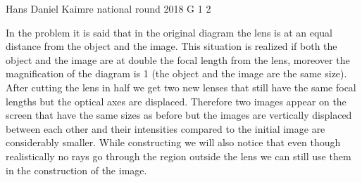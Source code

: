 \documentclass[11pt]{article}
\begin{document}
{Hans Daniel Kaimre} %
{national round} %
{2018} %
{G 1} %
{2} %
{

\ifEngSolution
In the problem it is said that in the original diagram the lens is at an equal distance from the object and the image. This situation is realized if both the object and the image are at double the focal length from the lens, moreover the magnification of the diagram is 1 (the object and the image are the same size). After cutting the lens in half we get two new lenses that still have the same focal lengths but the optical axes are displaced. Therefore two images appear on the screen that have the same sizes as before but the images are vertically displaced between each other and their intensities compared to the initial image are considerably smaller. While constructing we will also notice that even though realistically no rays go through the region outside the lens we can still use them in the construction of the image.
\begin{center}

\end{center}
\fi
}
\end{document}
